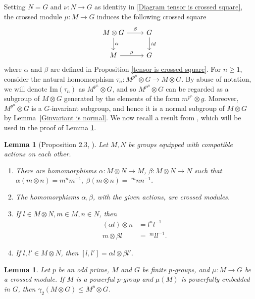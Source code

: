 \documentclass[12pt]{elsarticle}
\newtheorem{lemma}[theorem]{Lemma}
\newtheorem*{main corollary*}{Main Corollary}
\theoremstyle{definition}
\newcommand{\im}[1]{\text{Im}{(#1)}}
\begin{document}
Setting $N=G$ and $\nu:N\to G $ as identity in \eqref{Diagram tensor is crossed square}, the crossed module $\mu:M\to G$ induces the following crossed square
\begin{equation}\label{tenssquare}
    \begin{tikzcd} 
	M \otimes G \arrow[r,"\beta"]\arrow[d,"\alpha"] & G\arrow[d,"id"] 
	\\ M \arrow[r, "\mu"]& G
			\end{tikzcd}
\end{equation} where $\alpha$ and $\beta$ are defined in Proposition \ref{tensor is crossed square}. For $n\geq 1$, consider the natural homomorphism $\tau_n:M^{p^n}\otimes G\to M\otimes G$. By abuse of notation, we will denote $\im{\tau_n}$ as $M^{p^n}\otimes G$, and so $M^{p^n}\otimes G$  can be regarded as a subgroup of $M\otimes G$ generated by the elements of the form $m^{p^n}\otimes g$. Moreover, $M^{p^n}\otimes G$ is a $G$-invariant subgroup, and hence it is a normal subgroup of $M\otimes G$ by Lemma~\ref{Ginvariant is normal}. We now recall a result from \cite[Proposition 2.3]{BL87}, which will be used in the proof of Lemma \ref{commutator_of_ tensor_of_powerful_groups}.
\begin{lemma}[Proposition 2.3, \cite{BL87}]\label{BL identity}
    Let $M,N$ be groups equipped with compatible actions on each other.
    \begin{enumerate}
        \item [(i)] There are homomorphisms $\alpha: M\otimes N\to M$, $\beta:M\otimes N\to N$ such that $\alpha(m\otimes n)= m^nm^{-1}$, $\beta(m\otimes n)=\;^mnn^{-1}$.
        \item [(ii)] The homomorphisms $\alpha,\beta$, with the given actions, are crossed modules.
        \item [(iii)] If $l\in M\otimes N, m\in M, n\in N$, then 
        \begin{align*}
            (\alpha l)\otimes n&= l^nl^{-1}\\
            m\otimes\beta l&= \;^mll^{-1}.
        \end{align*}
        \item[(iv)] If $l,l'\in M\otimes N$, then $[l,l']=\alpha l\otimes \beta l'.$
        
    \end{enumerate}
\end{lemma}
\begin{lemma}\label{commutator_of_ tensor_of_powerful_groups}
    Let $p$ be an odd prime, $M$ and $G$ be finite $p$-groups, and ${\mu:M\to G}$ be a crossed module. If $M$ is a powerful $p$-group and $\mu(M)$ is powerfully embedded in $G$, then $\gamma_2(M\otimes G)\leqslant M^p\otimes G.$
\end{lemma}
\end{document}
